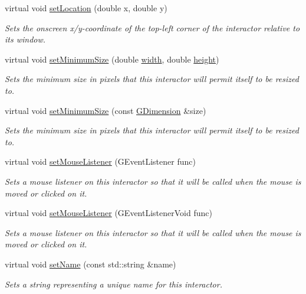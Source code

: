 \begin{DoxyCompactItemize}
virtual void \mbox{\hyperlink{classGInteractor_a04594e8ba9b98513a64f1da00dcae18c}{set\+Location}} (double x, double y)
\begin{DoxyCompactList}\small\item\em Sets the onscreen x/y-\/coordinate of the top-\/left corner of the interactor relative to its window. \end{DoxyCompactList}\item 
virtual void \mbox{\hyperlink{classGInteractor_a0cf428e207b7f22cc08138a90b1b87b2}{set\+Minimum\+Size}} (double \mbox{\hyperlink{classGTable_ad72663daf610f2a0833a2fc3d78e4fdf}{width}}, double \mbox{\hyperlink{classGTable_ad3774f6419003470f54fd495124ef51f}{height}})
\begin{DoxyCompactList}\small\item\em Sets the minimum size in pixels that this interactor will permit itself to be resized to. \end{DoxyCompactList}\item 
virtual void \mbox{\hyperlink{classGInteractor_a3b1046117ac6cb7abe467e00ba8a81f4}{set\+Minimum\+Size}} (const \mbox{\hyperlink{structGDimension}{G\+Dimension}} \&size)
\begin{DoxyCompactList}\small\item\em Sets the minimum size in pixels that this interactor will permit itself to be resized to. \end{DoxyCompactList}\item 
virtual void \mbox{\hyperlink{classGInteractor_a37d8dbc943f59920f705b0104f60bde2}{set\+Mouse\+Listener}} (G\+Event\+Listener func)
\begin{DoxyCompactList}\small\item\em Sets a mouse listener on this interactor so that it will be called when the mouse is moved or clicked on it. \end{DoxyCompactList}\item 
virtual void \mbox{\hyperlink{classGInteractor_aea7f647ea62d59f71b5fad6aa65eeaf9}{set\+Mouse\+Listener}} (G\+Event\+Listener\+Void func)
\begin{DoxyCompactList}\small\item\em Sets a mouse listener on this interactor so that it will be called when the mouse is moved or clicked on it. \end{DoxyCompactList}\item 
virtual void \mbox{\hyperlink{classGInteractor_a9d3a2685df23b5e7cbf59c19c4a1f9b5}{set\+Name}} (const std\+::string \&name)
\begin{DoxyCompactList}\small\item\em Sets a string representing a unique name for this interactor. \end{DoxyCompactList}\item 

\end{DoxyCompactItemize}
